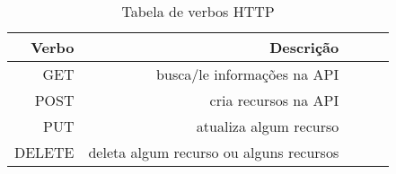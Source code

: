 \begin{table}[!htb]
    \centering
    \caption[Verbos HTTP]{Tabela de verbos HTTP
    \label{tab:verbos-http}}
    \begin{tabular}{rrrrr}
        \toprule
            Verbo & Descrição \\ 
        \midrule
            GET & busca/le informações na API \\
            POST & cria recursos na API \\
            PUT &  atualiza algum recurso \\
            DELETE  & deleta algum recurso ou alguns recursos \\
        \bottomrule
    \end{tabular}
\end{table}